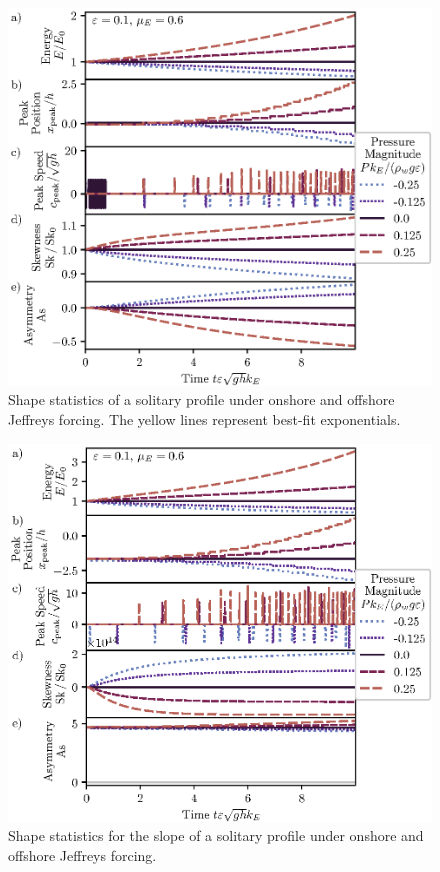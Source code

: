\documentclass{jfm}
\begin{document}
\begin{figure}
  \centering
  \includegraphics{Skew-Asymm.eps}
  \caption{
    Shape statistics of a solitary profile under onshore and offshore
    Jeffreys forcing. The yellow lines represent best-fit exponentials.
  }
\end{figure}

\begin{figure}
  \centering
  \includegraphics{Slope-Skew-Asymm.eps}
  \caption{
    Shape statistics for the slope of a solitary profile under onshore
    and offshore Jeffreys forcing.
  }
\end{figure}
\end{document}

